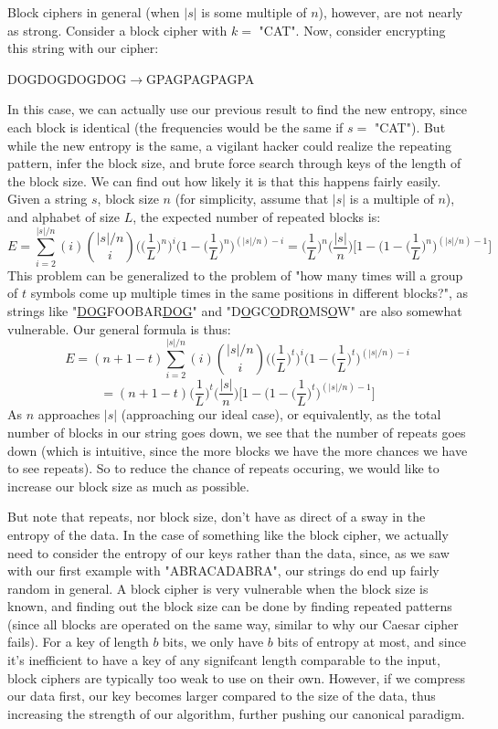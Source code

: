 \documentclass[11pt]{article}
\begin{document}
Block ciphers in general (when $|s|$ is some multiple of $n$), however, are not nearly as strong.
Consider a block cipher with $k=$ "CAT". Now, consider encrypting this string with our cipher:
\begin{center}DOGDOGDOGDOG$\rightarrow$GPAGPAGPAGPA\end{center}
In this case, we can actually use our previous result to find the new entropy, 
since each block is identical (the frequencies would be the same if $s=$ "CAT"). But while the new entropy is 
the same, a vigilant hacker could realize the repeating pattern, infer the block size, and brute force search through 
keys of the length of the block size. We can find out how likely it is that this happens fairly easily. 
Given a string $s$, block size $n$ (for simplicity, assume that $|s|$ is a multiple of $n$), and alphabet of size $L$, 
the expected number of repeated blocks is:
	$$E=\sum_{i=2}^{|s|/n}(i){{|s|/n}\choose i}\Big(\Big(\frac{1}{L}\Big)^n\Big)^i\Big(1-\Big(\frac{1}{L}\Big)^n\Big)^{(|s|/n)-i}
	=\Big(\frac{1}{L}\Big)^n\Big(\frac{|s|}{n}\Big)\Big[1-\Big(1-\Big(\frac{1}{L}\Big)^{n}\Big)^{(|s|/n)-1}\Big]$$
This problem can be generalized to the problem of "how many times will a group of  
$t$ symbols come up multiple times in the same positions in different blocks?", as strings like 
"\underline{DOG}FOOBAR\underline{DOG}" and "D\underline{O}GC\underline{O}DR\underline{O}MS\underline{O}W" 
are also somewhat vulnerable. Our general formula is thus:
	$$E=(n+1-t)
	\sum_{i=2}^{|s|/n}(i){{|s|/n}\choose i}
	\Big(\Big(\frac{1}{L}\Big)^{t}\Big)^i
	\Big(1-\Big(\frac{1}{L}\Big)^{t}\Big)^{(|s|/n)-i}$$
	$$=(n+1-t)
	\Big(\frac{1}{L}\Big)^{t}\Big(\frac{|s|}{n}\Big)
	\Big[1-\Big(1-\Big(\frac{1}{L}\Big)^{t}\Big)^{(|s|/n)-1}\Big]$$
As $n$ approaches $|s|$ (approaching our ideal case), or equivalently, as the total number of blocks in our string goes down, 
we see that the number of repeats goes down (which is intuitive, since the more blocks we have the more 
chances we have to see repeats). So to reduce the chance of repeats occuring, we would like to increase 
our block size as much as possible. 

But note that repeats, nor block size, don't have as direct of a sway in the entropy of the data. 
In the case of something like the block cipher, we actually need to consider the entropy of our keys rather than the data, 
since, as we saw with our first example with "ABRACADABRA", our strings do end up fairly random in general. 
A block cipher is very vulnerable when the block size is known, and finding out the block size can be 
done by finding repeated patterns (since all blocks are operated on the same way, similar to why our Caesar cipher fails). 
For a key of length $b$ bits, we only have $b$ bits of entropy at most, and since it's inefficient to have a key 
of any signifcant length comparable to the input, block ciphers are typically too weak to use on their own. 
However, if we compress our data first, our key becomes larger compared to the size of the data, 
thus increasing the strength of our algorithm, further pushing our canonical paradigm. 
\end{document}
